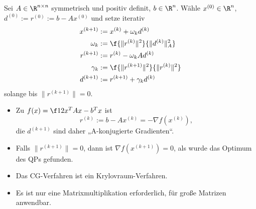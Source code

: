 \documentclass[11pt]{scrbook}
\begin{document}
\begin{df}[CG-Verfahren] \label{4.22}
	Sei $A \in \R^{n\times n}$ symmetrisch und positiv definit, $b \in \R^n$.
	Wähle $x^{(0)} \in \R^n$, $d^{(0)} := r^{(0)} := b - Ax^{(0)}$ und setze iterativ
	\begin{align*}
		x^{(k+1)} &:= x^{(k)} + \omega_k d^{(k)} \\
		\omega_k &:= \f {\|r^{(k)}\|^2}{\|d^{(k)}\|_A^2} \\
		r^{(k+1)} &:= r^{(k)} - \omega_k Ad^{(k)} \\
		\gamma_k &:= \f {\|r^{(k+1)}\|^2}{\|r^{(k)}\|^2} \\
		d^{(k+1)} &:= r^{(k+1)} + \gamma_k d^{(k)}
	\end{align*}
	solange bis $\|r^{(k+1)}\| = 0$.
	\begin{note}
		\begin{itemize}
			\item
				Zu $f(x) = \f 12 x^T A x - b^T x$ ist
				\[
					r^{(k)} := b - Ax^{(k)} = - \nabla f(x^{(k)}) ,
				\]
				die $d^{(k+1)}$ sind daher „A-konjugierte Gradienten“.
			\item
				Falls $\|r^{(k+1)}\| = 0$, dann ist $\nabla f(x^{(k+1)}) = 0$, als wurde das Optimum des QPs gefunden.
			\item
				Das CG-Verfahren ist ein Krylovraum-Verfahren.
			\item
				Es ist nur eine Matrixmultiplikation erforderlich, für große Matrizen anwendbar.
		\end{itemize}
	\end{note}
\end{df}
\end{document}
